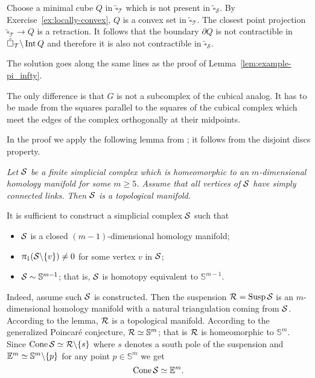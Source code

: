 Choose a minimal  cube $Q$ in $\tilde\square_{\mathcal{T}}$ which is not present in $\tilde\square_{\mathcal{S}}$.
By Exercise~\ref{ex:locally-convex}, $Q$ is a convex set in $\tilde\square_{\mathcal{T}}$.
The closest point projection $\tilde\square_{\mathcal{T}}\to Q$ is a retraction.
It follows that the boundary $\partial Q$ is not contractible in $\tilde\square_{\mathcal{T}}\backslash\mathop{\rm Int}\nolimits Q$ and therefore it is also not contractible in $\tilde\square_{\mathcal{S}}$.
\qeds

The solution goes along the same lines as the proof of Lemma~\ref{lem:example-pi_infty}.

The only difference is that $G$
is not a subcomplex of the cubical analog.
It has to be made from the squares parallel to the squares of the cubical complex which meet the edges of the complex orthogonally at their midpoints. \qeds

In the proof we apply the following lemma from \cite{edwards}; 
it follows from the disjoint discs property.

\medskip

\emph{Let $\mathcal{S}$ be a finite simplicial complex which 
is homeomorphic to an $m$-dimensional homology manifold for some $m\ge 5$.
Assume that  all vertices of
$\mathcal{S}$ have simply connected links.
Then $\mathcal{S}$ is a topological manifold.}

\medskip


It is sufficient to construct a simplicial complex $\mathcal{S}$
such that 
\begin{itemize}
\item $\mathcal{S}$ is a closed $(m-1)$-dimensional homology manifold;
\item $\uppi_1(\mathcal{S}\backslash\{v\})\ne0$ for some vertex $v$ in $\mathcal{S}$;
\item $\mathcal{S}\sim \mathbb{S}^{m-1}$; that is, $\mathcal{S}$ is homotopy equivalent to $\mathbb{S}^{m-1}$.
\end{itemize}

Indeed, assume such $\mathcal{S}$ is constructed.
Then the suspension
$\spc{R}\z=\Susp\spc{S}$
is an $m$-dimensional homology manifold with a natural triangulation coming from $\mathcal{S}$.
According to the lemma,
$\mathcal{R}$ is a topological manifold.
According to the generalized Poincar\'{e} conjecture,
$\mathcal{R}\simeq\mathbb{S}^m$;
that is
$\mathcal{R}$ is homeomorphic to $\mathbb{S}^m$.
Since $\mathop{\rm Cone}\nolimits \mathcal{S}\simeq \mathcal{R}\backslash\{s\}$ where $s$ denotes a south pole of the suspension 
and $\mathbb{E}^m\simeq \mathbb{S}^m\backslash\{p\}$
for any point $p\in \mathbb{S}^m$
we get 
\[\mathop{\rm Cone}\nolimits \mathcal{S}\simeq\mathbb{E}^m.\]

